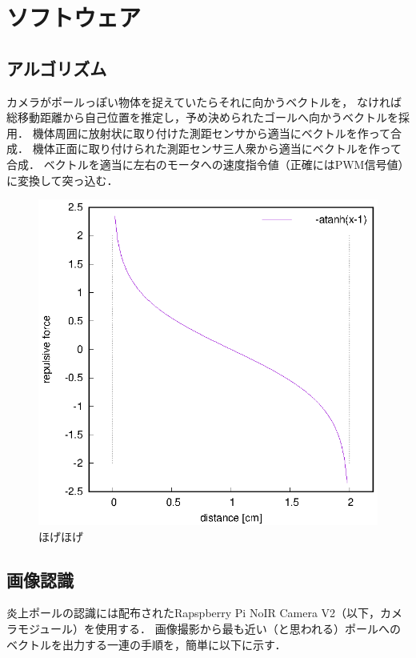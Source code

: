 \documentclass[11pt,a4paper]{jsarticle}
\begin{document}
\section{ソフトウェア} 

\subsection{アルゴリズム}
  カメラがポールっぽい物体を捉えていたらそれに向かうベクトルを，
  なければ総移動距離から自己位置を推定し，予め決められたゴールへ向かうベクトルを採用．
  機体周囲に放射状に取り付けた測距センサから適当にベクトルを作って合成．
  機体正面に取り付けられた測距センサ三人衆から適当にベクトルを作って合成．
  ベクトルを適当に左右のモータへの速度指令値（正確にはPWM信号値）に変換して突っ込む．

  \begin{figure}[b]
    \begin{center}
      \includegraphics[width=1.0\hsize]{plot/minus_atanh.eps}
    \end{center}
    \caption{ほげほげ}
    \label{fig::atanh}
  \end{figure}

\subsection{画像認識}
  炎上ポールの認識には配布されたRapspberry Pi NoIR Camera V2（以下，カメラモジュール）を使用する．
  画像撮影から最も近い（と思われる）ポールへのベクトルを出力する一連の手順を，簡単に以下に示す．
\end{document}
